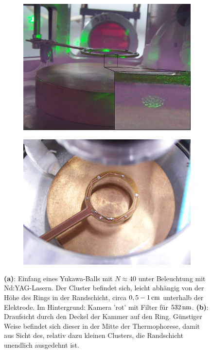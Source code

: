 \documentclass[numbers=noenddot,a4paper]{scrartcl}
\newcommand{\fett}[1]{\textbf{#1}}
\begin{document}
    			\begin{figure}[t]
    				\begin{subfigure}[t]{0.48\textwidth}
    					\centering
    					\includegraphics[width=\textwidth,height=0.75\textwidth]{figs/cam/innenansicht.jpg}
    					\caption{}
    					\label{img:eingefangenerball}
    				\end{subfigure}
    				\begin{subfigure}[t]{0.48\textwidth}
    					\centering
    					\includegraphics[width=\textwidth,height=0.75\textwidth]{figs/cam/topview.jpg}
    					\caption{}
    					\label{img:topview}
    				\end{subfigure}
    				\caption{\fett{(a)}: Einfang eines Yukawa-Balls mit $N\approx40$ unter Beleuchtung mit Nd:YAG-Lasern. Der Cluster befindet sich, leicht abhängig von der Höhe des Rings in der Randschicht, circa $\unit[0,5-1]{cm} $ unterhalb der Elektrode. Im Hintergrund: Kamera 'rot' mit Filter für $\unit[532]{nm}$. \fett{(b)}: Draufsicht durch den Deckel der Kammer auf den Ring. Günstiger Weise befindet sich dieser in der Mitte der Thermophorese, damit aus Sicht des, relativ dazu kleinen Clusters, die Randschicht unendlich ausgedehnt ist.}
    			\end{figure}
\end{document}
